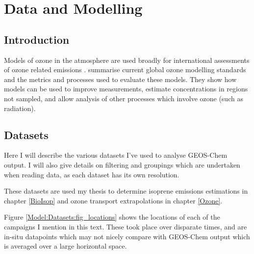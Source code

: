 
\chapter{Data and Modelling} %
\label{Model} %
  
\section{Introduction}
  Models of ozone in the atmosphere are used broadly for international assessments of ozone related emissions \citep{Young2018}.
  \cite{Young2018} summarise current global ozone modelling standards and the metrics and processes used to evaluate these models.
  They show how models can be used to improve measurements, estimate concentrations in regions not sampled, and allow analysis of other processes which involve ozone (such as radiation).


\section{Datasets}
\label{Model:Datasets}

  Here I will describe the various datasets I've used to analyse GEOS-Chem output.
  I will also give details on filtering and groupings which are undertaken when reading data, as each dataset has its own resolution.
  
  These datasets are used my thesis to determine isoprene emissions estimations in chapter \ref{BioIsop} and ozone transport extrapolations in chapter \ref{Ozone}.
  
  Figure \ref{Model:Datasets:fig_locations} shows the locations of each of the campaigns I mention in this text.
  These took place over disparate times, and are in-situ datapoints which may not nicely compare with GEOS-Chem output which is averaged over a large horizontal space.
  
  
